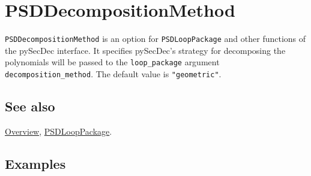 \documentclass[../FeynHelpersManual.tex]{subfiles}
\begin{document}
\hypertarget{psddecompositionmethod}{
\section{PSDDecompositionMethod}\label{psddecompositionmethod}}

\texttt{PSDDecompositionMethod} is an option for \texttt{PSDLoopPackage}
and other functions of the pySecDec interface. It specifies pySecDec's
strategy for decomposing the polynomials will be passed to the
\texttt{loop_package} argument \texttt{decomposition_method}. The
default value is \texttt{"geometric"}.

\subsection{See also}

\hyperlink{toc}{Overview}, \hyperlink{psdlooppackage}{PSDLoopPackage}.

\subsection{Examples}
\end{document}

